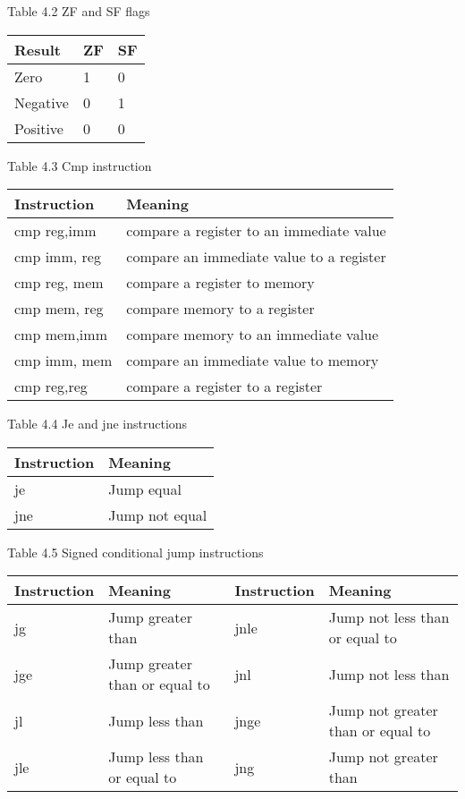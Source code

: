 \documentclass[10pt]{article}
\begin{document}
Table 4.2 ZF and SF flags

\begin{center}
\begin{tabular}{|l|l|l|}
\hline
Result & ZF & SF \\
\hline
Zero & 1 & 0 \\
\hline
Negative & 0 & 1 \\
\hline
Positive & 0 & 0 \\
\hline
\end{tabular}
\end{center}

Table 4.3 Cmp instruction

\begin{center}
\begin{tabular}{|l|l|}
\hline
Instruction & Meaning \\
\hline
cmp reg,imm & compare a register to an immediate value \\
\hline
cmp imm, reg & compare an immediate value to a register \\
\hline
cmp reg, mem & compare a register to memory \\
\hline
cmp mem, reg & compare memory to a register \\
\hline
cmp mem,imm & compare memory to an immediate value \\
\hline
cmp imm, mem & compare an immediate value to memory \\
\hline
cmp reg,reg & compare a register to a register \\
\hline
\end{tabular}
\end{center}

Table 4.4 Je and jne instructions

\begin{center}
\begin{tabular}{|l|l|}
\hline
Instruction & Meaning \\
\hline
je & Jump equal \\
\hline
jne & Jump not equal \\
\hline
\end{tabular}
\end{center}

Table 4.5 Signed conditional jump instructions

\begin{center}
\begin{tabular}{|l|l|l|l|}
\hline
Instruction & Meaning & Instruction & Meaning \\
\hline
jg & Jump greater than & jnle & Jump not less than or equal to \\
\hline
jge & Jump greater than or equal to & jnl & Jump not less than \\
\hline
jl & Jump less than & jnge & Jump not greater than or equal to \\
\hline
jle & Jump less than or equal to & jng & Jump not greater than \\
\hline
\end{tabular}
\end{center}
\end{document}
